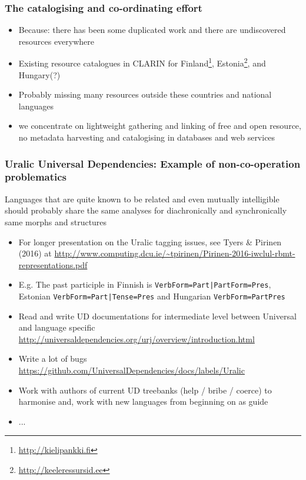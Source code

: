 \documentclass{beamer}
\begin{document}
\begin{frame}
    \frametitle{The catalogising and co-ordinating effort}
    \begin{itemize}
        \item Because: there has been some duplicated work and there are
            undiscovered resources everywhere
        \item Existing resource catalogues in CLARIN for
            Finland\footnote{\url{http://kielipankki.fi}},
            Estonia\footnote{\url{http://keeleressursid.ee}}, and
            Hungary(?)
        \item Probably missing many resources outside these countries and
            national languages
        \item we concentrate on lightweight gathering and linking of free and
            open resource, no metadata harvesting and catalogising in databases
            and web services
    \end{itemize}
\end{frame}

\begin{frame}
    \frametitle{Uralic Universal Dependencies: Example of non-co-operation
    problematics}
    Languages that are quite known to be related and even mutually intelligible
    should probably share the same analyses for diachronically and synchronically
    same morphs and structures
    \begin{itemize}
        \item For longer presentation on the Uralic tagging issues,
            see Tyers \& Pirinen (2016) at
            \url{http://www.computing.dcu.ie/~tpirinen/Pirinen-2016-iwclul-rbmt-representations.pdf}
        \item E.g. The past participle in Finnish is
            \texttt{VerbForm=Part|PartForm=Pres}, Estonian
            \texttt{VerbForm=Part|Tense=Pres} and Hungarian \texttt{VerbForm=PartPres}
        \item Read and write UD documentations for intermediate level between
            Universal and language specific \url{http://universaldependencies.org/urj/overview/introduction.html}
        \item Write a lot of bugs \url{https://github.com/UniversalDependencies/docs/labels/Uralic}
        \item Work with authors of current UD treebanks (help / bribe / coerce)
            to harmonise and, work with new languages from beginning on as
            guide
        \item ...
    \end{itemize}
\end{frame}
\end{document}
